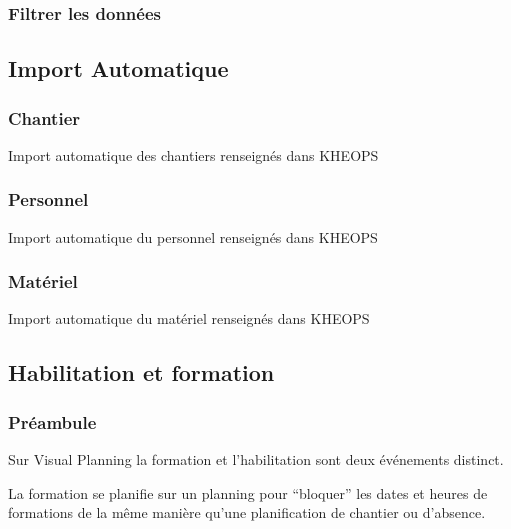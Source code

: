 \documentclass[letterpaper,10pt,english]{sphinxmanual}
\begin{document}
\subsubsection{Filtrer les données}
\label{\detokenize{guide_visual_planning/guide_utilisation:filtrer-les-donnees}}

\subsection{Import Automatique}
\label{\detokenize{fonctionnalitees/import_automatique:import-automatique}}\label{\detokenize{fonctionnalitees/import_automatique::doc}}

\subsubsection{Chantier}
\label{\detokenize{fonctionnalitees/import_automatique:chantier}}
Import automatique des chantiers renseignés dans KHEOPS


\subsubsection{Personnel}
\label{\detokenize{fonctionnalitees/import_automatique:personnel}}
Import automatique du personnel renseignés dans KHEOPS


\subsubsection{Matériel}
\label{\detokenize{fonctionnalitees/import_automatique:materiel}}
Import automatique du matériel renseignés dans KHEOPS


\subsection{Habilitation et formation}
\label{\detokenize{fonctionnalitees/habilitation_formation:habilitation-et-formation}}\label{\detokenize{fonctionnalitees/habilitation_formation::doc}}

\subsubsection{Préambule}
\label{\detokenize{fonctionnalitees/habilitation_formation:preambule}}
Sur Visual Planning la formation et l’habilitation sont deux événements distinct.

La formation se planifie sur un planning pour “bloquer” les dates et heures de formations de la même manière qu’une planification de chantier ou d’absence.
\end{document}
